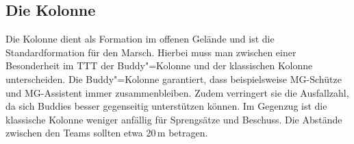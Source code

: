 \subsection{Die Kolonne}\label{Kolonne}
Die Kolonne dient als Formation im offenen Gelände und ist die Standardformation für den Marsch. Hierbei muss man zwischen einer Besonderheit im \ac{TTT} der Buddy"=Kolonne und der klassischen Kolonne unterscheiden. Die Buddy"=Kolonne garantiert, dass beispielsweise MG-Schütze und MG-Assistent immer zusammenbleiben. Zudem verringert sie die Ausfallzahl, da sich Buddies besser gegenseitig unterstützen können. Im Gegenzug ist die klassische Kolonne weniger anfällig für Sprengsätze und Beschuss. Die Abstände zwischen den Teams sollten etwa 20\,m betragen.
\begin{figure}[h]
	\centering
	\label{fig:Kolonne}
\end{figure}

